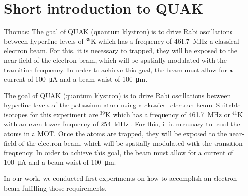 
\chapter{Short introduction to QUAK}
\label{ch:Short introduction to QuaK}



Thomas: The goal of QUAK (quantum klystron) is to drive Rabi oscillations between hyperfine levels of $^{39}\mathrm{K}$  which has a frequency of \SI{461.7}{\mega\hertz} \cite{tiecke:potassium-properties}  a classical electron beam. For this, it is necessary to  trapped, they will be exposed to the near-field of the electron beam, which will be spatially modulated with the transition frequency. In order to achieve this goal, the beam must allow for a current of \SI{100}{\micro\ampere}
and a beam waist of \SI{100}{\micro\meter}.

The goal of QUAK (quantum klystron) is to drive Rabi oscillations between hyperfine levels of the potassium atom using a classical electron beam. Suitable isotopes for this experiment are $^{39}\mathrm{K}$ which has a frequency of \SI{461.7}{\mega\hertz} or $^{41}\mathrm{K}$ with an even lower frequency of \SI{254}{\mega\hertz} \cite{tiecke:potassium-properties}. For this, it is necessary to -cool the atoms in a MOT. Once the atoms are trapped, they will be exposed to the near-field of the electron beam, which will be spatially modulated with the transition frequency. In order to achieve this goal, the beam must allow for a current of \SI{100}{\micro\ampere} and a beam waist of \SI{100}{\micro\meter}.

In our work, we conducted first experiments on how to accomplish an electron beam fulfilling those requirements.
